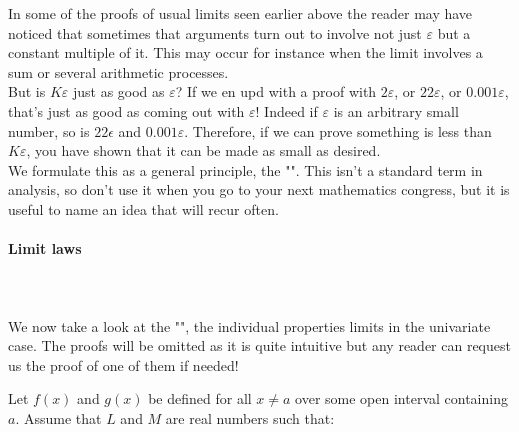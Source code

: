 	\begin{tcolorbox}[enhanced,title=Remark,colframe=black,arc=10pt,drop lifted shadow,after skip=15pt plus 2pt]
	In some of the proofs of usual limits seen earlier above the reader may have noticed that sometimes that arguments turn out to involve not just $\varepsilon$ but a constant multiple of it. This may occur for instance when the limit involves a sum or several arithmetic processes.\\
	
	But is $K\varepsilon$ just as good as $\varepsilon$? If we en upd with a proof with  $2 \varepsilon$, or $22 \varepsilon$, or $0.001\varepsilon$, that's just as good as coming out with $\varepsilon$! Indeed if $\varepsilon$ is an arbitrary small number, so is $22 \epsilon$ and $0.001\varepsilon$. Therefore, if we can prove something is less than $K \varepsilon$, you have shown that it can be made as small as desired.\\
	
	We formulate this as a general principle, the "". This isn't a standard term in analysis, so don't use it when you go to your next mathematics congress, but it is useful to name an idea that will recur often.
	\end{tcolorbox}
	
	\paragraph{Limit laws}\mbox{}\\\\
	We now take a look at the "", the individual properties limits in the univariate case. The proofs will be omitted as it is quite intuitive but any reader can request us the proof of one of them if needed!
	
	Let $f(x)$ and $g(x)$ be defined for all $x\neq a$ over some open interval containing $a$. Assume that $L$ and $M$ are real numbers such that:
	
